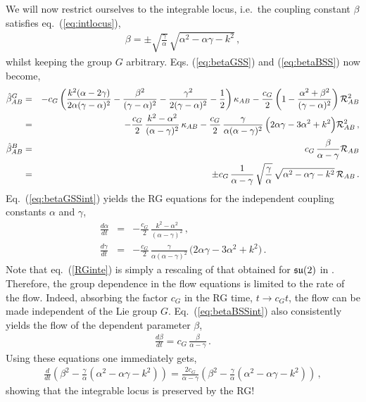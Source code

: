 \documentclass[12pt]{article}
\def\R{{\mathbb R}}
\renewcommand{\R}{\mathcal{R}}
\begin{document}
\noindent We will now restrict ourselves to the integrable locus, i.e.\ the coupling constant $\beta $ satisfies eq.~(\ref{eq:intlocus}), 
\begin{eqnarray}
\beta= \pm \sqrt{\frac{\gamma }{\alpha }}\, \sqrt{ \alpha ^2- \alpha \gamma -k^2}\, ,
\end{eqnarray} 
whilst keeping the group $G$ arbitrary. Eqs. (\ref{eq:betaGSS}) and (\ref{eq:betaBSS}) now become,
 \begin{eqnarray}
  \hat\beta_{AB}^{G}  &= & -c_G\left(\frac{k^{2}(\alpha-2\gamma)}{2\alpha(\gamma-\alpha)^{2}} - \frac{\beta^{2}}{(\gamma - \alpha)^{2}} - \frac{\gamma^{2}}{2(\gamma - \alpha)^{2}} - \frac{1}{2} \right)\kappa_{AB}  -\frac{c_G}{2}  \left(1-\frac{\alpha^{2}+\beta^{2}}{(\gamma - \alpha)^{2}}  \right) \R^{2}_{AB}\nonumber\\
&=& - \frac{c_G}{2}\, \frac{k^2- \alpha ^2}{( \alpha- \gamma )^2}\,\kappa_{AB}-
\frac{c_G}{2}\, \frac{ \gamma }{\alpha ( \alpha- \gamma )^2}\, \Big(2 \alpha \gamma -3 \alpha ^2+k^2\Big){\cal R}^2_{AB} 
\,,\label{eq:betaGSSint}\\
  \hat\beta_{AB}^{B} & = &  c_G\,\frac{\beta}{\alpha-\gamma} {\cal R}_{AB} \nonumber\\
&=&\pm c_G \,\frac{1}{\alpha-\gamma}\, \sqrt{\frac{\gamma }{\alpha }}\, \sqrt{ \alpha ^2- \alpha \gamma -k^2}\, {\cal R}_{AB}
\,.\label{eq:betaBSSint}
 \end{eqnarray}
 \noindent Eq.~(\ref{eq:betaGSSint}) yields the RG equations for the independent coupling constants $\alpha $ and $\gamma $,
 \begin{eqnarray}
\frac{d \alpha}{dt} &=& - \frac{c_G}{2}\, \frac{k^2- \alpha ^2}{( \alpha- \gamma )^2}\,,\nonumber\\
\frac{d \gamma }{dt} &=&-\frac{c_G}{2}\, \frac{ \gamma }{\alpha ( \alpha- \gamma )^2}\, \Big(2 \alpha \gamma -3 \alpha ^2+k^2\Big)\,.\label{RGinte}
\end{eqnarray} 
Note that eq.~(\ref{RGinte}) is simply a rescaling of that obtained for $\frak{su}(2)$ in \cite{Kawaguchi:2011mz}. Therefore, the group dependence in the flow equations is limited to the rate of the flow. Indeed, absorbing the factor $c_G$ in the RG time, $t\rightarrow c_G t$, the flow can be made independent of the Lie group $G$.
Eq.~(\ref{eq:betaBSSint}) also consistently yields the flow of the dependent parameter $\beta $,
\begin{eqnarray}
\frac{d \beta}{d t} = c_G\,\frac{\beta}{\alpha-\gamma}\,.
\end{eqnarray} 
Using these equations one immediately gets,
\begin{eqnarray}
\frac{d}{d t} \left( \beta^2 - \frac{\gamma}{\alpha} \left( \alpha^2 - \alpha \gamma - k^2 \right)  \right) = \frac{2 c_G}{\alpha- \gamma} \left( \beta^2 - \frac{\gamma}{\alpha} \left( \alpha^2 - \alpha \gamma - k^2 \right)  \right)  \,, 
\end{eqnarray} 
showing that the integrable locus is preserved by the RG! 
\end{document}
